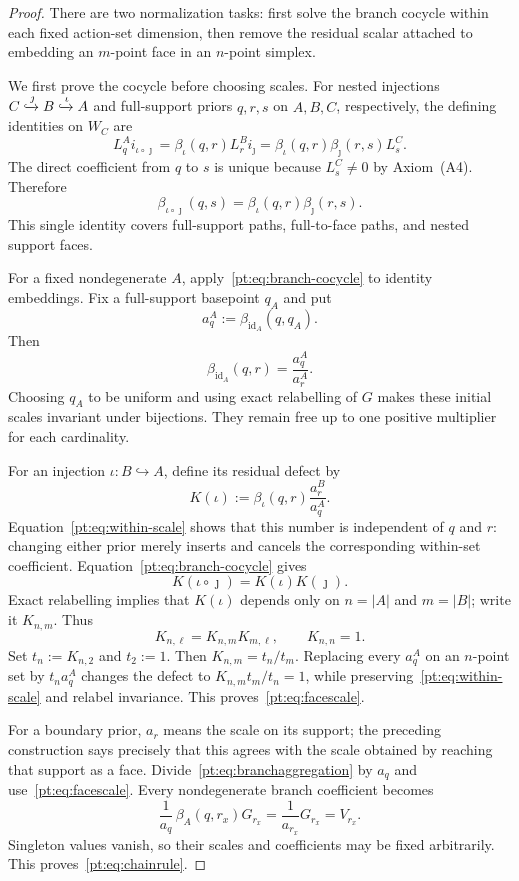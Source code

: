 \begin{proof}
There are two normalization tasks: first solve the branch cocycle within each
fixed action-set dimension, then remove the residual scalar attached to
embedding an $m$-point face in an $n$-point simplex.

We first prove the cocycle before choosing scales.  For nested injections
$C\xhookrightarrow{\jmath}B\xhookrightarrow{\iota}A$ and full-support
priors $q,r,s$ on $A,B,C$, respectively, the defining identities on $W_C$
are
\[
 L_q^A i_{\iota\circ\jmath}
 =\beta_\iota(q,r)L_r^B i_\jmath
 =\beta_\iota(q,r)\beta_\jmath(r,s)L_s^C.
\]
The direct coefficient from $q$ to $s$ is unique because $L_s^C\ne0$ by
Axiom~\textup{(A4)}.  Therefore
\begin{equation}
 \beta_{\iota\circ\jmath}(q,s)
 =\beta_\iota(q,r)\beta_\jmath(r,s).
\label{pt:eq:branch-cocycle}
\end{equation}
This single identity covers full-support paths, full-to-face paths, and
nested support faces.

For a fixed nondegenerate $A$, apply~\eqref{pt:eq:branch-cocycle} to identity
embeddings.  Fix a full-support basepoint $q_A$ and put
\[
 a_q^A:=\beta_{\mathrm{id}_A}(q,q_A).
\]
Then
\[
 \beta_{\mathrm{id}_A}(q,r)=\frac{a_q^A}{a_r^A}.
\tag{WS}\label{pt:eq:within-scale}
\]
Choosing $q_A$ to be uniform and using exact relabelling of $G$ makes these
initial scales invariant under bijections.  They remain free up to one
positive multiplier for each cardinality.

For an injection $\iota:B\hookrightarrow A$, define its residual defect by
\[
 K(\iota):=\beta_\iota(q,r)\frac{a_r^B}{a_q^A}.
\]
Equation~\eqref{pt:eq:within-scale} shows that this number is independent of
$q$ and $r$: changing either prior merely inserts and cancels the
corresponding within-set coefficient.  Equation~\eqref{pt:eq:branch-cocycle}
gives
\[
 K(\iota\circ\jmath)=K(\iota)K(\jmath).
\]
Exact relabelling implies that $K(\iota)$ depends only on
$n=|A|$ and $m=|B|$; write it $K_{n,m}$.  Thus
\[
 K_{n,\ell}=K_{n,m}K_{m,\ell},\qquad K_{n,n}=1.
\]
Set $t_n:=K_{n,2}$ and $t_2:=1$.  Then
$K_{n,m}=t_n/t_m$.  Replacing every $a_q^A$ on an $n$-point set by
$t_n a_q^A$ changes the defect to
$K_{n,m}t_m/t_n=1$, while preserving~\eqref{pt:eq:within-scale} and
relabel invariance.  This proves~\eqref{pt:eq:facescale}.

For a boundary prior, $a_r$ means the scale on its support; the preceding
construction says precisely that this agrees with the scale obtained by
reaching that support as a face.  Divide~\eqref{pt:eq:branchaggregation} by
$a_q$ and use~\eqref{pt:eq:facescale}.  Every nondegenerate branch coefficient
becomes
\[
 \frac1{a_q}\,\beta_A(q,r_x)G_{r_x}
 =\frac1{a_{r_x}}G_{r_x}=V_{r_x}.
\]
Singleton values vanish, so their scales and coefficients may be fixed
arbitrarily.  This proves~\eqref{pt:eq:chainrule}.
\end{proof}

